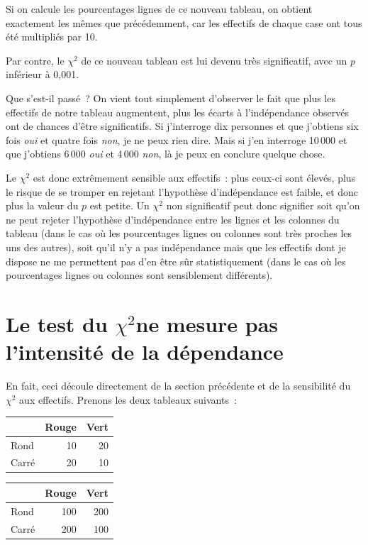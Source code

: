 \documentclass[a4paper,10pt,twoside,francais]{report}
\newcommand{\chid}{$\chi^2$\xspace}
\newcommand{\chidpdf}{\texorpdfstring{$\chi^2$\xspace}{X\texttwosuperior\xspace}}
\begin{document}
Si on calcule les pourcentages lignes de ce nouveau tableau, on
obtient exactement les mêmes que précédemment, car les effectifs de
chaque case ont tous été multipliés par 10.

Par contre, le \chid de ce nouveau tableau est lui devenu très
significatif, avec un $p$ inférieur à 0,001.

Que s'est-il passé~? On vient tout simplement d'observer le fait que
plus les effectifs de notre tableau augmentent, plus les écarts à
l'indépendance observés ont de chances d'être significatifs. Si
j'interroge dix personnes et que j'obtiens six fois \textit{oui} et
quatre fois \textit{non}, je ne peux rien dire. Mais si j'en interroge
10\,000 et que j'obtiens 6\,000 \textit{oui} et 4\,000 \textit{non},
là je peux en conclure quelque chose.

Le \chid est donc extrêmement sensible aux effectifs~: plus ceux-ci
sont élevés, plus le risque de se tromper en rejetant l'hypothèse
d'indépendance est faible, et donc plus la valeur du $p$ est
petite. Un \chid non significatif peut donc signifier soit qu'on ne
peut rejeter l'hypothèse d'indépendance entre les lignes et les
colonnes du tableau (dans le cas où les pourcentages lignes ou
colonnes sont très proches les uns des autres), soit qu'il n'y a pas
indépendance mais que les effectifs dont je dispose ne me permettent
pas d'en être sûr statistiquement (dans le cas où les pourcentages
lignes ou colonnes sont sensiblement différents).


\section{Le test du \chidpdf ne mesure pas l'intensité de la dépendance}
\label{sec-intdep}

En fait, ceci découle directement de la section précédente et de la
sensibilité du \chid aux effectifs. Prenons les deux tableaux
suivants~:

\begin{center}
  \hfill
  \begin{minipage}[c]{.46\linewidth}
    \begin{tabular}[!h]{lrr}
      \toprule
      & Rouge & Vert \\
      \midrule
       Rond & 10 & 20 \\
       Carré & 20 & 10 \\
      \bottomrule
    \end{tabular}
  \end{minipage} 
  \hfill
  \begin{minipage}[c]{.46\linewidth}
    \begin{tabular}[!h]{lrr}
      \toprule
      & Rouge & Vert \\
      \midrule
      Rond & 100 & 200 \\
      Carré &  200 & 100 \\
      \bottomrule
    \end{tabular}
  \end{minipage}
  \hfill
\end{center}
\end{document}
